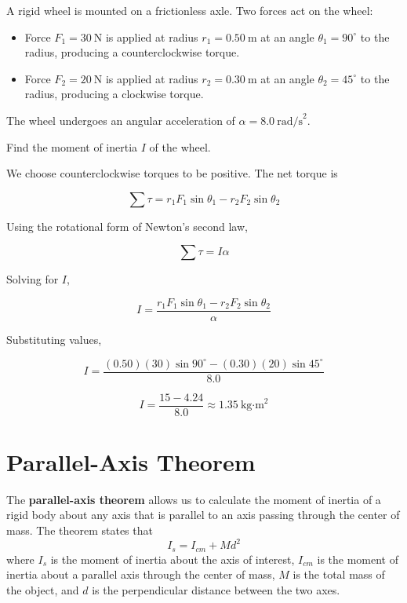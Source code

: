 \begin{Exercise}[title=Moment of Inertia from Multiple Torques,label=mominert1]
A rigid wheel is mounted on a frictionless axle. Two forces act on the wheel:

\begin{itemize}
\item Force $F_1 = 30\ \text{N}$ is applied at radius $r_1 = 0.50\ \text{m}$ at an angle $\theta_1 = 90^\circ$ to the radius, producing a counterclockwise torque.
\item Force $F_2 = 20\ \text{N}$ is applied at radius $r_2 = 0.30\ \text{m}$ at an angle $\theta_2 = 45^\circ$ to the radius, producing a clockwise torque.
\end{itemize}

The wheel undergoes an angular acceleration of $\alpha = 8.0\ \text{rad/s}^2$.

Find the moment of inertia $I$ of the wheel.
\end{Exercise}
\begin{Answer}[ref=mominert1]
We choose counterclockwise torques to be positive. The net torque is

\[
\sum \tau = r_1 F_1 \sin\theta_1 - r_2 F_2 \sin\theta_2
\]

Using the rotational form of Newton's second law,

\[
\sum \tau = I \alpha
\]

Solving for $I$,

\[
I = \frac{r_1 F_1 \sin\theta_1 - r_2 F_2 \sin\theta_2}{\alpha}
\]

Substituting values,

\[
I = \frac{(0.50)(30)\sin90^\circ - (0.30)(20)\sin45^\circ}{8.0}
\]

\[
I = \frac{15 - 4.24}{8.0} \approx 1.35\ \text{kg·m}^2
\]

\end{Answer}

\section{Parallel-Axis Theorem}

The \textbf{parallel-axis theorem} allows us to calculate the moment of inertia of a rigid body about any axis that is parallel to an axis passing through the center of mass. The theorem states that 
\begin{equation}
I_s = I_{cm} + Md^2
\end{equation}
where $I_s$ is the moment of inertia about the axis of interest, $I_{cm}$ is the moment of inertia about a parallel axis through the center of mass, $M$ is the total mass of the object, and $d$ is the perpendicular distance between the two axes.

